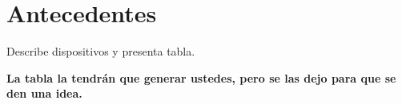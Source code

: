


\section{Antecedentes}
Describe dispositivos y presenta tabla.

\textbf{La tabla la tendrán que generar ustedes, pero se las dejo para que se den una idea.}





